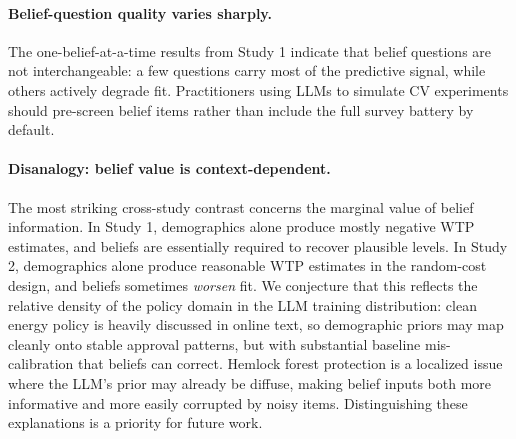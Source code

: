 \documentclass[12pt]{article}
\begin{document}
\paragraph{Belief-question quality varies sharply.} The
one-belief-at-a-time results from Study 1 indicate that belief questions
are not interchangeable: a few questions carry most of the predictive
signal, while others actively degrade fit. Practitioners using LLMs to
simulate CV experiments should pre-screen belief items rather than
include the full survey battery by default.

\paragraph{Disanalogy: belief value is context-dependent.} The most
striking cross-study contrast concerns the marginal value of belief
information. In Study 1, demographics alone produce mostly negative WTP
estimates, and beliefs are essentially required to recover plausible
levels. In Study 2, demographics alone produce reasonable WTP estimates
in the random-cost design, and beliefs sometimes \emph{worsen} fit. We
conjecture that this reflects the relative density of the policy domain
in the LLM training distribution: clean energy policy is heavily discussed
in online text, so demographic priors may map cleanly onto stable approval
patterns, but with substantial baseline mis-calibration that beliefs can
correct. Hemlock forest protection is a localized issue where the LLM's
prior may already be diffuse, making belief inputs both more informative
and more easily corrupted by noisy items. Distinguishing these
explanations is a priority for future work.
\end{document}
